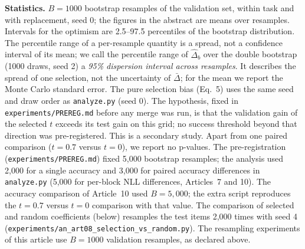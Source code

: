 \documentclass[conference]{IEEEtran}
\begin{document}
\textbf{Statistics.} $B=1000$ bootstrap resamples of the validation set, within task and with replacement, seed 0; the figures in the abstract are means over resamples. Intervals for the optimism are 2.5--97.5 percentiles of the bootstrap distribution. The percentile range of a per-resample quantity is a spread, not a confidence interval of its mean; we call the percentile range of $\hat\Delta_b$ over the double bootstrap (1000 draws, seed 2) a \emph{95\% dispersion interval across resamples}. It describes the spread of one selection, not the uncertainty of $\bar\Delta$; for the mean we report the Monte Carlo standard error. The pure selection bias (Eq.~5) uses the same seed and draw order as \texttt{analyze.py} (seed 0). The hypothesis, fixed in \texttt{experiments/PREREG.md} before any merge was run, is that the validation gain of the selected $t$ exceeds its test gain on this grid; no success threshold beyond that direction was pre-registered. This is a secondary study. Apart from one paired comparison ($t=0.7$ versus $t=0$), we report no p-values. The pre-registration (\texttt{experiments/PREREG.md}) fixed 5,000 bootstrap resamples; the analysis used 2,000 for a single accuracy and 3,000 for paired accuracy differences in \texttt{analyze.py} (5,000 for per-block NLL differences, Articles~7 and 10). The accuracy comparison of Article~10 used $B=5{,}000$; the extra script reproduces the $t=0.7$ versus $t=0$ comparison with that value. The comparison of selected and random coefficients (below) resamples the test items 2,000 times with seed 4 (\texttt{experiments/an\_art08\_selection\_vs\_random.py}). The resampling experiments of this article use $B=1000$ validation resamples, as declared above.
\end{document}
